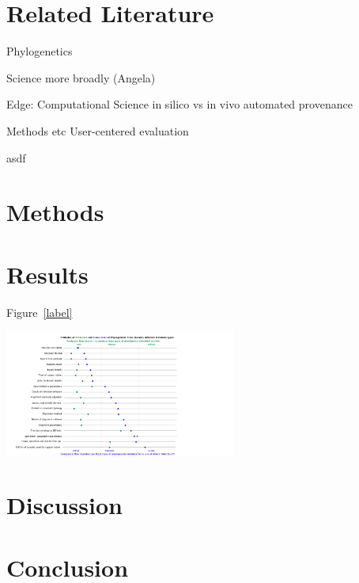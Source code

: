 \documentclass[12pt]{scrartcl}
\newenvironment{Figure}
  {\par\medskip\noindent\minipage{\linewidth}}
  {\endminipage\par\medskip}
\begin{document}
\begin{multicols}{2}
\section{Related Literature}

Phylogenetics

Science more broadly (Angela)

Edge: Computational Science
in silico vs in vivo
automated provenance

Methods etc
User-centered evaluation

\begin{compactitem}
  \item asdf
\end{compactitem}

\section{Methods}

\section{Results}
Figure~\ref{label}
\begin{Figure}
	\includegraphics[width=3in]{rasters/OTOL graph - wide.png}
	\label{label}
\end{Figure}

\section{Discussion}


\section{Conclusion}




\end{multicols}
\end{document}
